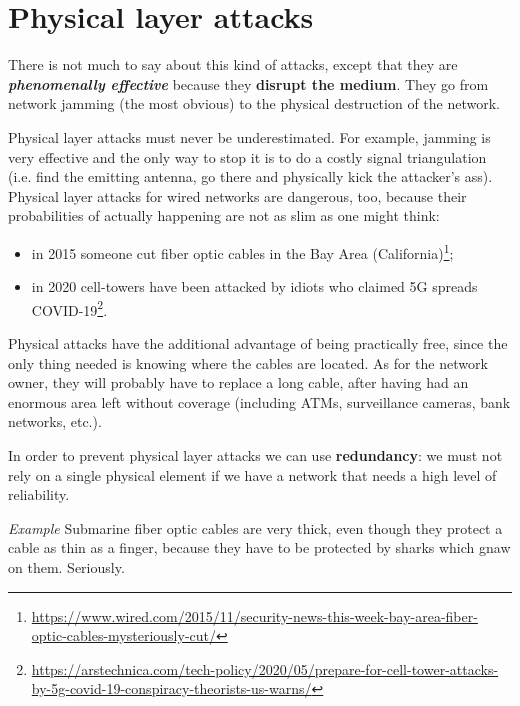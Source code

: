 \vspace{0.5em}


\section{Physical layer attacks}
There is not much to say about this kind of attacks, except that they are \textit{\textbf{phenomenally effective}} because they \textbf{disrupt the medium}. They go from network jamming (the most obvious) to the physical destruction of the network.

Physical layer attacks must never be underestimated. For example, jamming is very effective and the only way to stop it is to do a costly signal triangulation (i.e. find the emitting antenna, go there and physically kick the attacker’s ass). Physical layer attacks for wired networks are dangerous, too, because their probabilities of actually happening are not as slim as one might think:

\begin{itemize}
	\item in 2015 someone cut fiber optic cables in the Bay Area (California)\footnote{\url{https://www.wired.com/2015/11/security-news-this-week-bay-area-fiber-optic-cables-mysteriously-cut/}};
	\item in 2020 cell-towers have been attacked by idiots who claimed 5G spreads COVID-19\footnote{\url{https://arstechnica.com/tech-policy/2020/05/prepare-for-cell-tower-attacks-by-5g-covid-19-conspiracy-theorists-us-warns/}}.
\end{itemize}

Physical attacks have the additional advantage of being practically free, since the only thing needed is knowing where the cables are located. As for the network owner, they will probably have to replace a long cable, after having had an enormous area left without coverage (including ATMs, surveillance cameras, bank networks, etc.).

In order to prevent physical layer attacks we can use \textbf{redundancy}: we must not rely on a single physical element if we have a network that needs a high level of reliability.

\vspace{0.5em}

\emph{Example} Submarine fiber optic cables are very thick, even though they protect a cable as thin as a finger, because they have to be protected by sharks which gnaw on them. Seriously.

